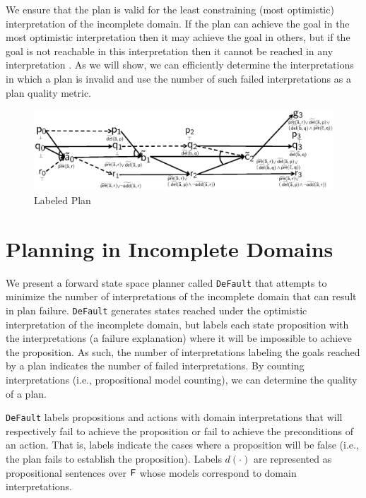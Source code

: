 \documentclass[letterpaper]{article}
\def\default{{\tt DeFault}}
\def\citep#1{\cite{#1}}
\begin{document}
We ensure that the plan is valid for the least constraining (most optimistic)
interpretation of the incomplete domain. If the plan can achieve the goal in the
most optimistic interpretation then it may achieve the goal in others, but if
the goal is not reachable in this interpretation then it cannot be reached in
any interpretation \citep{USU-CS-TR-11-001}.  As we will show, we can
efficiently determine the interpretations in which a plan is invalid and use the
number of such failed interpretations as a plan quality metric.


\begin{figure}[t]\centering
\vspace*{-1cm}
\includegraphics[width=1\linewidth]{WeberBryceICAPS11Fig1.eps}
\vspace*{-1cm}\caption{\label{fig:example} Labeled Plan}
\end{figure}



\section{Planning in Incomplete Domains}

We present a forward state space planner called \default{} that attempts to
minimize the number of interpretations of the incomplete domain that can result
in plan failure.  \default{} generates states reached under the optimistic
interpretation of the incomplete domain, but labels each state proposition with
the interpretations (a failure explanation) where it will be impossible to
achieve the proposition. As such, the number of interpretations labeling the
goals reached by a plan indicates the number of failed interpretations.  By
counting interpretations (i.e., propositional model counting), we can determine
the quality of a plan.

\default{} labels propositions and actions with domain interpretations that will
respectively fail to achieve the proposition or fail to achieve the
preconditions of an action.  That is, labels indicate the cases where a
proposition will be false (i.e., the plan fails to establish the proposition). 
Labels $d(\cdot)$ are represented as  propositional sentences over ${\sf F}$
whose models correspond to domain interpretations.
\end{document}

